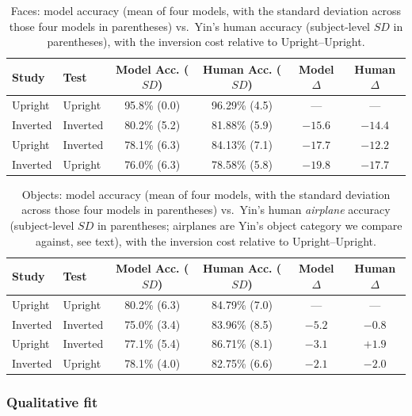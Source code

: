 \documentclass[11pt]{article}
\begin{document}
\begin{table}[h]
\centering
\caption{Faces: model accuracy (mean of four models, with the standard deviation across those
four models in parentheses) vs.\ Yin's human accuracy (subject-level $SD$ in parentheses), with
the inversion cost relative to Upright--Upright.}
\label{tab:faces}
\begin{tabular}{llcccc}
\toprule
Study & Test & Model Acc. ($SD$) & Human Acc. ($SD$) & Model $\Delta$ & Human $\Delta$ \\
\midrule
Upright  & Upright  & 95.8\% (0.0) & 96.29\% (4.5) & --- & --- \\
Inverted & Inverted & 80.2\% (5.2) & 81.88\% (5.9) & $-15.6$ & $-14.4$ \\
Upright  & Inverted & 78.1\% (6.3) & 84.13\% (7.1) & $-17.7$ & $-12.2$ \\
Inverted & Upright  & 76.0\% (6.3) & 78.58\% (5.8) & $-19.8$ & $-17.7$ \\
\bottomrule
\end{tabular}
\end{table}

\begin{table}[h]
\centering
\caption{Objects: model accuracy (mean of four models, with the standard deviation across those
four models in parentheses) vs.\ Yin's human \emph{airplane} accuracy (subject-level $SD$ in
parentheses; airplanes are Yin's object category we compare against, see text), with the
inversion cost relative to Upright--Upright.}
\label{tab:objects}
\begin{tabular}{llcccc}
\toprule
Study & Test & Model Acc. ($SD$) & Human Acc. ($SD$) & Model $\Delta$ & Human $\Delta$ \\
\midrule
Upright  & Upright  & 80.2\% (6.3) & 84.79\% (7.0) & --- & --- \\
Inverted & Inverted & 75.0\% (3.4) & 83.96\% (8.5) & $-5.2$ & $-0.8$ \\
Upright  & Inverted & 77.1\% (5.4) & 86.71\% (8.1) & $-3.1$ & $+1.9$ \\
Inverted & Upright  & 78.1\% (4.0) & 82.75\% (6.6) & $-2.1$ & $-2.0$ \\
\bottomrule
\end{tabular}
\end{table}

\subsubsection*{Qualitative fit}
\end{document}
